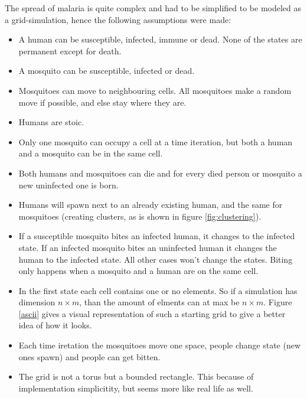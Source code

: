 \documentclass[a4paper]{report}
\begin{document}
The spread of malaria is quite complex and had to be simplified to be modeled as
a grid-simulation, hence the following assumptions were made:

\begin{itemize}
    \item A human can be susceptible, infected, immune or dead. None of the states are
        permanent except for death.
    \item A mosquito can be susceptible, infected or dead. 
    \item Mosquitoes can move to neighbouring cells. All mosquitoes make a
        random move if possible, and else stay where they are.
    \item Humans are stoic.
    \item Only one mosquito can occupy a cell at a time iteration, but both a
        human and a mosquito can be in the same cell.
    \item Both humans and mosquitoes can die and for every died person or
        mosquito a new uninfected one is born.
    \item Humans will spawn next to an already existing human, and the same for
        mosquitoes (creating clusters, as is shown in figure \ref{fig:clustering}).
    \item If a susceptible mosquito bites an infected human, it changes to the
        infected state. If an infected mosquito bites an uninfected human it
        changes the human to the infected state. All other cases won't change
        the states. Biting only happens when a mosquito and a human are on the
        same cell.
    \item In the first state each cell contains one or no elements. So
    if a simulation has dimension $n \times m$, than the amount of elments can
    at max be $n \times m$. Figure \ref{ascii} gives a visual representation of
    such a starting grid to give a better idea of how it looks.
    \item Each time iretation the mosquitoes move one space, people change state
        (new ones spawn)
        and people can get bitten.
    \item The grid is not a torus but a bounded rectangle. This because of
        implementation simplicitity, but seems more like real life as well.
\end{itemize}
\end{document}
